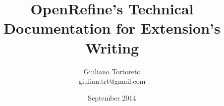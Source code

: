 \documentclass[11pt,a4paper]{article}
\begin{document}
\title{OpenRefine's Technical Documentation for Extension's Writing}
\date{September 2014}
\author{Giuliano Tortoreto\\ giulian.trt@gmail.com}
	\maketitle
	\tableofcontents
	
\end{document}

